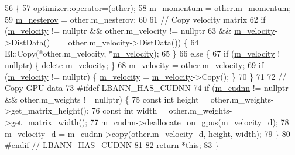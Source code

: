 \begin{DoxyCode}
56                                     \{
57   \hyperlink{classlbann_1_1optimizer_ab7811e0a4d2d9b594140aed78b6de743}{optimizer::operator=}(other);
58   \hyperlink{classlbann_1_1sgd_a2e56d66d350debcf0d2c3ad76c214074}{m\_momentum} = other.m\_momentum;
59   \hyperlink{classlbann_1_1sgd_a82da488e5d1530f50f67cd4ea30909cb}{m\_nesterov} = other.m\_nesterov;
60 
61   \textcolor{comment}{// Copy velocity matrix}
62   \textcolor{keywordflow}{if} (\hyperlink{classlbann_1_1sgd_a27f2d893014cef8357edffb63bf649f0}{m\_velocity} != \textcolor{keyword}{nullptr} && other.m\_velocity != \textcolor{keyword}{nullptr}
63       && \hyperlink{classlbann_1_1sgd_a27f2d893014cef8357edffb63bf649f0}{m\_velocity}->DistData() == other.m\_velocity->DistData()) \{
64     El::Copy(*other.m\_velocity, *\hyperlink{classlbann_1_1sgd_a27f2d893014cef8357edffb63bf649f0}{m\_velocity});
65   \}
66   \textcolor{keywordflow}{else} \{
67     \textcolor{keywordflow}{if} (\hyperlink{classlbann_1_1sgd_a27f2d893014cef8357edffb63bf649f0}{m\_velocity} != \textcolor{keyword}{nullptr}) \{ \textcolor{keyword}{delete} \hyperlink{classlbann_1_1sgd_a27f2d893014cef8357edffb63bf649f0}{m\_velocity}; \}
68     \hyperlink{classlbann_1_1sgd_a27f2d893014cef8357edffb63bf649f0}{m\_velocity} = other.m\_velocity;
69     \textcolor{keywordflow}{if} (\hyperlink{classlbann_1_1sgd_a27f2d893014cef8357edffb63bf649f0}{m\_velocity} != \textcolor{keyword}{nullptr}) \{ \hyperlink{classlbann_1_1sgd_a27f2d893014cef8357edffb63bf649f0}{m\_velocity} = \hyperlink{classlbann_1_1sgd_a27f2d893014cef8357edffb63bf649f0}{m\_velocity}->Copy(); \}
70   \}
71 
72   \textcolor{comment}{// Copy GPU data}
73 \textcolor{preprocessor}{  #ifdef LBANN\_HAS\_CUDNN}
74   \textcolor{keywordflow}{if} (\hyperlink{classlbann_1_1optimizer_a2f24dbeaca18b06f4aa7d179bbf96680}{m\_cudnn} != \textcolor{keyword}{nullptr} && other.m\_weights != \textcolor{keyword}{nullptr}) \{
75     \textcolor{keyword}{const} \textcolor{keywordtype}{int} height = other.m\_weights->get\_matrix\_height();
76     \textcolor{keyword}{const} \textcolor{keywordtype}{int} width = other.m\_weights->get\_matrix\_width();
77     \hyperlink{classlbann_1_1optimizer_a2f24dbeaca18b06f4aa7d179bbf96680}{m\_cudnn}->deallocate\_on\_gpus(m\_velocity\_d);
78     m\_velocity\_d = \hyperlink{classlbann_1_1optimizer_a2f24dbeaca18b06f4aa7d179bbf96680}{m\_cudnn}->copy(other.m\_velocity\_d, height, width);
79   \}
80 \textcolor{preprocessor}{  #endif // LBANN\_HAS\_CUDNN}
81 
82   \textcolor{keywordflow}{return} *\textcolor{keyword}{this};
83 \}
\end{DoxyCode}

